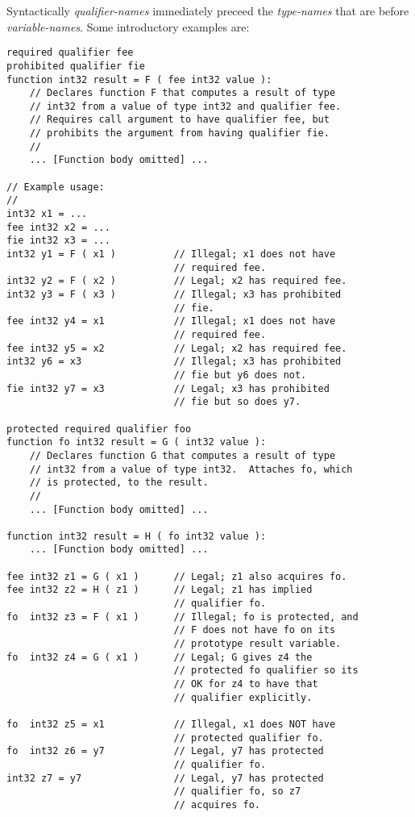 \documentclass[12pt]{article}
\newenvironment{indpar}[1][0.3in]%
	{\begin{list}{}%
		     {\setlength{\itemsep}{0in}%
		      \setlength{\topsep}{0in}%
		      \setlength{\parsep}{1ex}%
		      \setlength{\labelwidth}{#1}%
		      \setlength{\leftmargin}{#1}%
		      \addtolength{\leftmargin}{\labelsep}}%
	 \item}%
	{\end{list}}
\begin{document}
Syntactically {\em qualifier-names} immediately preceed the {\em type-names}
that are before {\em variable-names}.  Some introductory examples are:
\begin{indpar}\begin{verbatim}
required qualifier fee
prohibited qualifier fie
function int32 result = F ( fee int32 value ):
    // Declares function F that computes a result of type
    // int32 from a value of type int32 and qualifier fee.
    // Requires call argument to have qualifier fee, but
    // prohibits the argument from having qualifier fie.
    //
    ... [Function body omitted] ...

// Example usage:
//
int32 x1 = ...
fee int32 x2 = ...
fie int32 x3 = ...
int32 y1 = F ( x1 )          // Illegal; x1 does not have
                             // required fee.
int32 y2 = F ( x2 )          // Legal; x2 has required fee.
int32 y3 = F ( x3 )          // Illegal; x3 has prohibited
                             // fie.
fee int32 y4 = x1            // Illegal; x1 does not have
                             // required fee.
fee int32 y5 = x2            // Legal; x2 has required fee.
int32 y6 = x3                // Illegal; x3 has prohibited
                             // fie but y6 does not.
fie int32 y7 = x3            // Legal; x3 has prohibited
                             // fie but so does y7.

protected required qualifier foo
function fo int32 result = G ( int32 value ):
    // Declares function G that computes a result of type
    // int32 from a value of type int32.  Attaches fo, which
    // is protected, to the result.
    //
    ... [Function body omitted] ...

function int32 result = H ( fo int32 value ):
    ... [Function body omitted] ...

fee int32 z1 = G ( x1 )      // Legal; z1 also acquires fo.
fee int32 z2 = H ( z1 )      // Legal; z1 has implied
                             // qualifier fo.
fo  int32 z3 = F ( x1 )      // Illegal; fo is protected, and
                             // F does not have fo on its
                             // prototype result variable.
fo  int32 z4 = G ( x1 )      // Legal; G gives z4 the
                             // protected fo qualifier so its
                             // OK for z4 to have that
                             // qualifier explicitly.

fo  int32 z5 = x1            // Illegal, x1 does NOT have
                             // protected qualifier fo.
fo  int32 z6 = y7            // Legal, y7 has protected
                             // qualifier fo.
int32 z7 = y7                // Legal, y7 has protected
                             // qualifier fo, so z7
                             // acquires fo.
\end{verbatim}\end{indpar}
\end{document}
